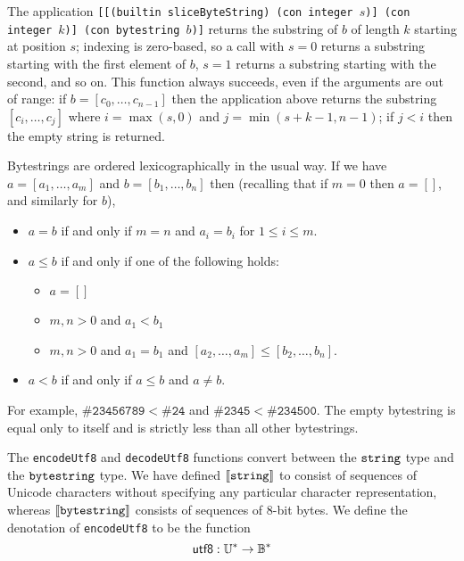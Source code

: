 \label{note:slicebytestring}
The application \texttt{[[(builtin sliceByteString) (con integer $s$)] (con
    integer $k$)] (con bytestring $b$)]} returns the substring of $b$ of length
$k$ starting at position $s$; indexing is zero-based, so a call with $s=0$
returns a substring starting with the first element of $b$, $s=1$ returns a
substring starting with the second, and so on.  This function always succeeds,
even if the arguments are out of range: if $b=[c_0, \ldots, c_{n-1}]$ then the
  application above returns the substring $[c_i, \ldots, c_j]$ where
  $i=\max(s,0)$ and $j=\min(s+k-1, n-1)$; if $j<i$ then the empty string is returned.

\label{note:bytestring-comparison}
Bytestrings are ordered lexicographically in the usual way. If we have $a =
  [a_1, \ldots, a_m]$ and $b = [b_1, \ldots, b_n]$ then (recalling that if $m=0$
  then $a=[]$, and similarly for $b$),
\begin{itemize}
\item $a = b$ if and only if $m=n$ and $a_i = b_i$ for $1 \leq i \leq m$.

\item $a \leq b$ if and only if one of the following holds:
\begin{itemize}
  \item $a = []$
  \item $m,n > 0$ and $a_1 < b_1$
  \item $m,n > 0$ and $a_1 = b_1$ and $[a_2,\ldots,a_m] \leq [b_2,\ldots,b_n]$.
\end{itemize}
\item $a < b$ if and only if $a \leq b$ and $a \neq b$.
\end{itemize}
\noindent For example, $\mathtt{\#23456789} < \mathtt{\#24}$ and
$\mathtt{\#2345} < \mathtt{\#234500}$.  The empty bytestring is equal only to
itself and is strictly less than all other bytestrings.

\label{note:bytestring-encoding}
The \texttt{encodeUtf8} and \texttt{decodeUtf8} functions convert between the
$\mathtt{string}$ type and the $\mathtt{bytestring}$ type.  We have defined
$\llbracket\mathit{\mathtt{string}}\rrbracket$ to consist of sequences of Unicode characters without
specifying any particular character representation, whereas
$\llbracket\mathit{\mathtt{bytestring}}\rrbracket$ consists of sequences of 8-bit bytes.  We define the
denotation of \texttt{encodeUtf8} to be the function
$$
\mathsf{utf8}: \mathbb{U}^* \rightarrow \mathbb{B}^*
$$

